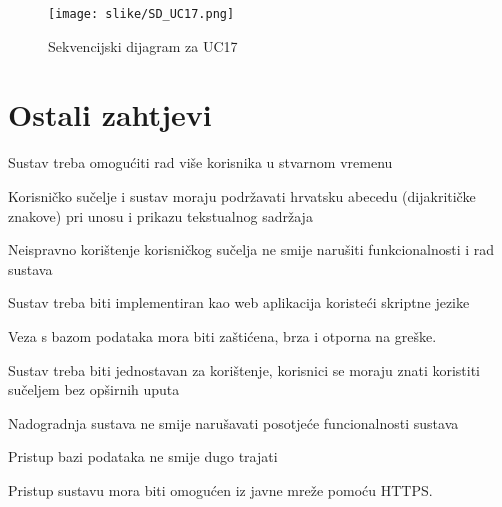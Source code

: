 				\begin{figure}[H]
					\texttt{[image: slike/SD\_UC17.png]}
					\centering
					\caption{Sekvencijski dijagram za UC17}
					\label{fig:UC17}
				\end{figure}
				
				\eject
	
		\section{Ostali zahtjevi}
		
%		 
%			 

		\begin{packed_item}
		
			\item Sustav treba omogućiti rad više korisnika u stvarnom vremenu
			\item 	Korisničko sučelje i sustav moraju podržavati hrvatsku abecedu (dijakritičke znakove) pri unosu i prikazu tekstualnog sadržaja
			\item Neispravno korištenje korisničkog sučelja ne smije narušiti funkcionalnosti i rad sustava
			\item Sustav treba biti implementiran kao web aplikacija koristeći skriptne jezike
			\item Veza s bazom podataka mora biti zaštićena, brza i otporna na greške.
			\item Sustav treba biti jednostavan za korištenje, korisnici se moraju znati koristiti sučeljem bez opširnih uputa
			\item Nadogradnja sustava ne smije narušavati posotjeće funcionalnosti sustava
			\item Pristup bazi podataka ne smije dugo trajati
			\item Pristup sustavu mora biti omogućen iz javne mreže pomoću HTTPS.
		
		\end{packed_item}
			 
			 
	
